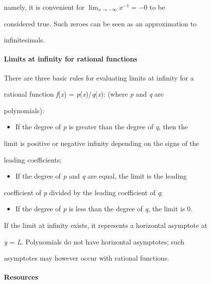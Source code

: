 namely, it is convenient for $\lim_{x \to -\infty}{x^{-1}} = -0$ to be

considered true. Such zeroes can be seen as an approximation to

infinitesimals.



\paragraph{Limits at infinity for rational functions}



There are three basic rules for evaluating limits at infinity for a

rational function \textit{f}(\textit{x}) = \textit{p}(\textit{x})/\textit{q}(\textit{x}): (where \textit{p} and \textit{q} are

polynomials):



\begin{itemize}
    \item If the degree of \textit{p} is greater than the degree of \textit{q}, then the
\end{itemize}
    limit is positive or negative infinity depending on the signs of the

    leading coefficients;

\begin{itemize}
    \item If the degree of \textit{p} and \textit{q} are equal, the limit is the leading
\end{itemize}
    coefficient of \textit{p} divided by the leading coefficient of \textit{q};

\begin{itemize}
    \item If the degree of \textit{p} is less than the degree of \textit{q}, the limit is 0.
\end{itemize}

If the limit at infinity exists, it represents a horizontal asymptote at

\textit{y} = \textit{L}. Polynomials do not have horizontal asymptotes; such

asymptotes may however occur with rational functions.



\paragraph{Resources}




